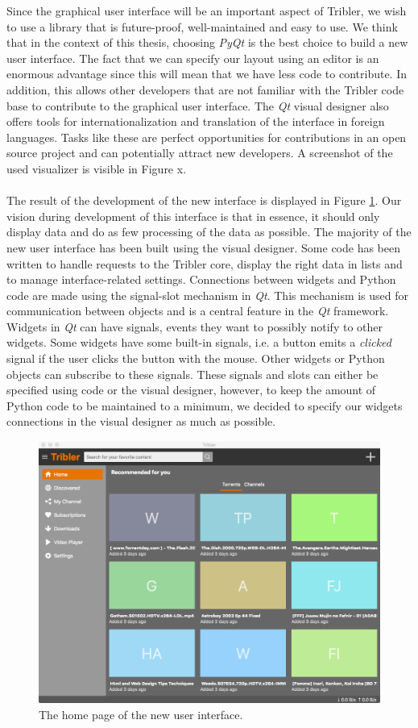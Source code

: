 Since the graphical user interface will be an important aspect of Tribler, we wish to use a library that is future-proof, well-maintained and easy to use. We think that in the context of this thesis, choosing \emph{PyQt} is the best choice to build a new user interface. The fact that we can specify our layout using an editor is an enormous advantage since this will mean that we have less code to contribute. In addition, this allows other developers that are not familiar with the Tribler code base to contribute to the graphical user interface. The \emph{Qt} visual designer also offers tools for internationalization and translation of the interface in foreign languages. Tasks like these are perfect opportunities for contributions in an open source project and can potentially attract new developers. A screenshot of the used visualizer is visible in Figure x.\\\\
The result of the development of the new interface is displayed in Figure \ref{fig:new-gui-1}. Our vision during development of this interface is that in essence, it should only display data and do as few processing of the data as possible. The majority of the new user interface has been built using the visual designer. Some code has been written to handle requests to the Tribler core, display the right data in lists and to manage interface-related settings. Connections between widgets and Python code are made using the signal-slot mechanism in \emph{Qt}. This mechanism is used for communication between objects and is a central feature in the \emph{Qt} framework. Widgets in \emph{Qt} can have signals, events they want to possibly notify to other widgets. Some widgets have some built-in signals, i.e. a button emits a \emph{clicked} signal if the user clicks the button with the mouse. Other widgets or Python objects can subscribe to these signals. These signals and slots can either be specified using code or the visual designer, however, to keep the amount of Python code to be maintained to a minimum, we decided to specify our widgets connections in the visual designer as much as possible.\\

\begin{figure}[t]
	\centering
	\includegraphics[width=0.8\columnwidth]{images/improving_qa/newgui1}
	\caption{The home page of the new user interface.}
	\label{fig:new-gui-1}
\end{figure}

